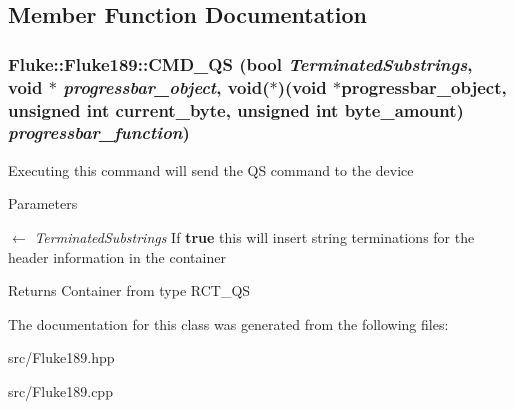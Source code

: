 \subsection{Member Function Documentation}
\hypertarget{classFluke_1_1Fluke189_a5747ae5dbcc0d078566dd8ff28c3d6b5}{
\subsubsection[{CMD\_\-QS}]{ Fluke::Fluke189::CMD\_\-QS (bool {\em TerminatedSubstrings}, \/  void $\ast$ {\em progressbar\_\-object}, \/  void($\ast$)(void $\ast$progressbar\_\-object, unsigned int current\_\-byte, unsigned int byte\_\-amount) {\em progressbar\_\-function})}}
\label{classFluke_1_1Fluke189_a5747ae5dbcc0d078566dd8ff28c3d6b5}
Executing this command will send the QS command to the device 
\begin{DoxyParams}{Parameters}
\item[\mbox{$\leftarrow$} {\em TerminatedSubstrings}]If {\bfseries true} this will insert string terminations for the header information in the container\end{DoxyParams}
\begin{DoxyReturn}{Returns}
Container from type RCT\_\-QS 
\end{DoxyReturn}


The documentation for this class was generated from the following files:\begin{DoxyCompactItemize}
\item 
src/Fluke189.hpp\item 
src/Fluke189.cpp\end{DoxyCompactItemize}
